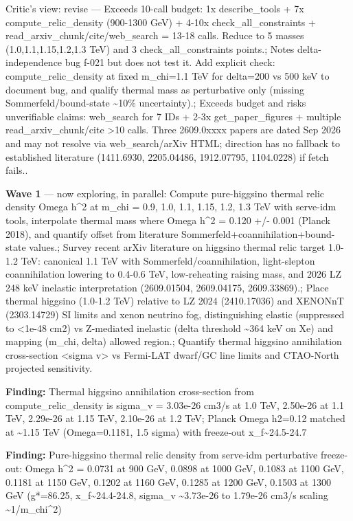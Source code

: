 \documentclass[11pt,a4paper]{article}
\begin{document}
\begin{enumerate}
Critic's view: revise --- Exceeds 10-call budget: 1x describe\_tools + 7x compute\_relic\_density (900-1300 GeV) + 4-10x check\_all\_constraints + read\_arxiv\_chunk/cite/web\_search = 13-18 calls. Reduce to 5 masses (1.0,1.1,1.15,1.2,1.3 TeV) and 3 check\_all\_constraints points.; Notes delta-independence bug f-021 but does not test it. Add explicit check: compute\_relic\_density at fixed m\_chi=1.1 TeV for delta=200 vs 500 keV to document bug, and qualify thermal mass as perturbative only (missing Sommerfeld/bound-state \textasciitilde{}10\% uncertainty).; Exceeds budget and risks unverifiable claims: web\_search for 7 IDs + 2-3x get\_paper\_figures + multiple read\_arxiv\_chunk/cite \textgreater{}10 calls. Three 2609.0xxxx papers are dated Sep 2026 and may not resolve via web\_search/arXiv HTML; direction has no fallback to established literature (1411.6930, 2205.04486, 1912.07795, 1104.0228) if fetch fails..

\end{enumerate}
\textbf{Wave 1} --- now exploring, in parallel: Compute pure-higgsino thermal relic density Omega h\textasciicircum{}2 at m\_chi = 0.9, 1.0, 1.1, 1.15, 1.2, 1.3 TeV with serve-idm tools, interpolate thermal mass where Omega h\textasciicircum{}2 = 0.120 +/- 0.001 (Planck 2018), and quantify offset from literature Sommerfeld+coannihilation+bound-state values.; Survey recent arXiv literature on higgsino thermal relic target 1.0-1.2 TeV: canonical 1.1 TeV with Sommerfeld/coannihilation, light-slepton coannihilation lowering to 0.4-0.6 TeV, low-reheating raising mass, and 2026 LZ 248 keV inelastic interpretation (2609.01504, 2609.04175, 2609.33869).; Place thermal higgsino (1.0-1.2 TeV) relative to LZ 2024 (2410.17036) and XENONnT (2303.14729) SI limits and xenon neutrino fog, distinguishing elastic (suppressed to \textless{}1e-48 cm2) vs Z-mediated inelastic (delta threshold \textasciitilde{}364 keV on Xe) and mapping (m\_chi, delta) allowed region.; Quantify thermal higgsino annihilation cross-section \textless{}sigma v\textgreater{} vs Fermi-LAT dwarf/GC line limits and CTAO-North projected sensitivity.

\textbf{Finding:} Thermal higgsino annihilation cross-section from compute\_relic\_density is sigma\_v = 3.03e-26 cm3/s at 1.0 TeV, 2.50e-26 at 1.1 TeV, 2.29e-26 at 1.15 TeV, 2.10e-26 at 1.2 TeV; Planck Omega h2=0.12 matched at \textasciitilde{}1.15 TeV (Omega=0.1181, 1.5 sigma) with freeze-out x\_f\textasciitilde{}24.5-24.7

\textbf{Finding:} Pure-higgsino thermal relic density from serve-idm perturbative freeze-out: Omega h\textasciicircum{}2 = 0.0731 at 900 GeV, 0.0898 at 1000 GeV, 0.1083 at 1100 GeV, 0.1181 at 1150 GeV, 0.1202 at 1160 GeV, 0.1285 at 1200 GeV, 0.1503 at 1300 GeV (g*=86.25, x\_f\textasciitilde{}24.4-24.8, sigma\_v \textasciitilde{}3.73e-26 to 1.79e-26 cm3/s scaling \textasciitilde{}1/m\_chi\textasciicircum{}2)
\end{document}
